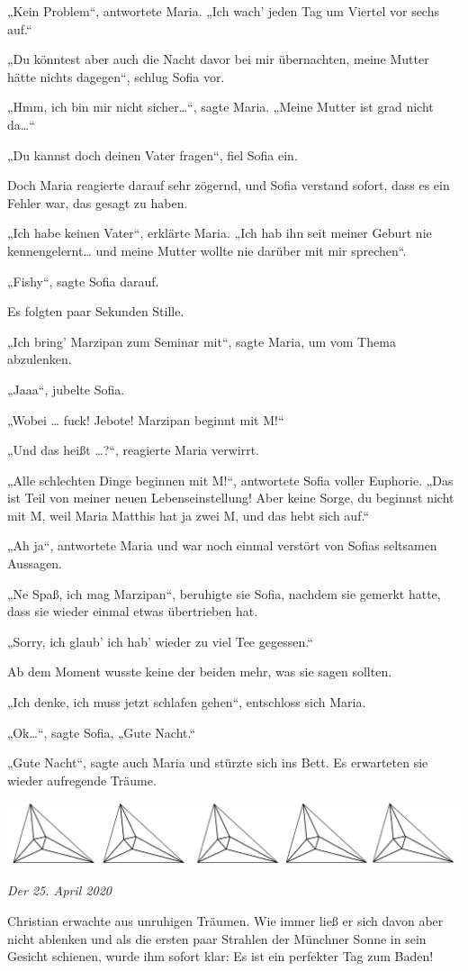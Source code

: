\documentclass[oneside]{memoir}
\newcommand{\parasep}{
\bigskip
\bigskip
\begin{center} 
   \includegraphics[scale=.08]{parasep5.jpg} 
\end{center}
\bigskip
\bigskip
}
\begin{document}
„Kein Problem“, antwortete Maria. „Ich wach' jeden Tag um Viertel vor sechs auf.“

„Du könntest aber auch die Nacht davor bei mir übernachten, meine Mutter hätte nichts dagegen“, schlug Sofia vor.

„Hmm, ich bin mir nicht sicher\ldots“, sagte Maria. „Meine Mutter ist grad nicht da\ldots“

„Du kannst doch deinen Vater fragen“, fiel Sofia ein.

Doch Maria reagierte darauf sehr zögernd, und Sofia verstand sofort, dass es ein Fehler war, das gesagt zu haben.

„Ich habe keinen Vater“, erklärte Maria. „Ich hab ihn seit meiner Geburt nie kennengelernt\ldots{} und meine Mutter wollte nie darüber mit mir sprechen“.

„Fishy“, sagte Sofia darauf.

Es folgten paar Sekunden Stille.

„Ich bring' Marzipan zum Seminar mit“,  sagte Maria, um vom Thema abzulenken.

„Jaaa“, jubelte Sofia.

„Wobei \ldots{} fuck! Jebote! Marzipan beginnt mit M!“

„Und das heißt \ldots?“, reagierte Maria verwirrt.

„Alle schlechten Dinge beginnen mit M!“, antwortete Sofia voller Euphorie. „Das ist Teil von meiner neuen Lebenseinstellung! Aber keine Sorge, du beginnst nicht mit M, weil Maria Matthis hat ja zwei M, und das hebt sich auf.“

„Ah ja“, antwortete Maria und war noch einmal verstört von Sofias seltsamen Aussagen.

„Ne Spaß, ich mag Marzipan“, beruhigte sie Sofia, nachdem sie gemerkt hatte, dass sie wieder einmal etwas übertrieben hat.

„Sorry, ich glaub' ich hab' wieder zu viel Tee gegessen.“

Ab dem Moment wusste keine der beiden mehr, was sie sagen sollten.

„Ich denke, ich muss jetzt schlafen gehen“, entschloss sich Maria.

„Ok\ldots“, sagte Sofia, „Gute Nacht.“

„Gute Nacht“, sagte auch Maria und stürzte sich ins Bett. 
Es erwarteten sie wieder aufregende Träume.

\parasep

\textit{Der 25. April 2020}

Christian erwachte aus unruhigen Träumen. Wie immer ließ er sich davon aber nicht ablenken und als die ersten paar Strahlen der Münchner Sonne in sein Gesicht schienen, wurde ihm sofort klar: Es ist ein perfekter Tag zum Baden!
\end{document}
